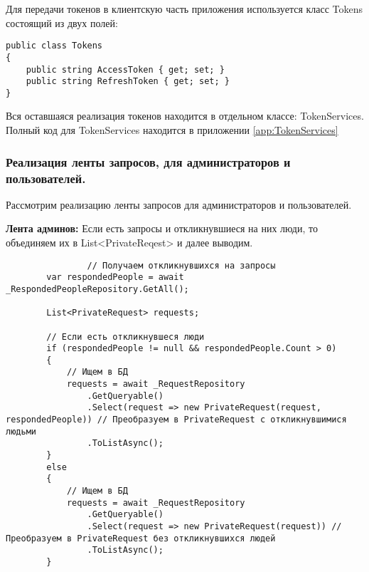 Для передачи токенов в клиентскую часть приложения используется класс Tokens состоящий из двух полей:

\begin{verbatim}
public class Tokens
{
    public string AccessToken { get; set; }
    public string RefreshToken { get; set; }
}
\end{verbatim}

Вся оставшаяся реализация токенов находится в отдельном классе: TokenServices. Полный код для TokenServices находится в приложении \ref{app:TokenServices}

\subsubsection{Реализация ленты запросов, для администраторов и пользователей.}

Рассмотрим реализацию ленты запросов для администраторов и пользователей.

\textbf{Лента админов:} Если есть запросы и откликнувшиеся на них люди, то объединяем их в List<PrivateReqest> и далее выводим.
\begin{verbatim}
				// Получаем откликнувшихся на запросы
        var respondedPeople = await _RespondedPeopleRepository.GetAll();

        List<PrivateRequest> requests;

        // Если есть откликнувшеся люди
        if (respondedPeople != null && respondedPeople.Count > 0)
        {
            // Ищем в БД
            requests = await _RequestRepository
                .GetQueryable()
                .Select(request => new PrivateRequest(request, respondedPeople)) // Преобразуем в PrivateRequest с откликнувшимися людьми
                .ToListAsync();
        }
        else
        {
            // Ищем в БД
            requests = await _RequestRepository
                .GetQueryable()
                .Select(request => new PrivateRequest(request)) // Преобразуем в PrivateRequest без откликнувшихся людей
                .ToListAsync();
        }
\end{verbatim}

